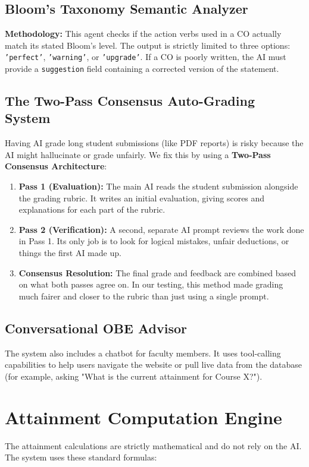 \documentclass[conference]{IEEEtran}
\begin{document}
\subsection{Bloom's Taxonomy Semantic Analyzer}
\textbf{Methodology:} This agent checks if the action verbs used in a CO actually match its stated Bloom's level. The output is strictly limited to three options: \texttt{'perfect'}, \texttt{'warning'}, or \texttt{'upgrade'}. If a CO is poorly written, the AI must provide a \texttt{suggestion} field containing a corrected version of the statement.

\subsection{The Two-Pass Consensus Auto-Grading System}
Having AI grade long student submissions (like PDF reports) is risky because the AI might hallucinate or grade unfairly. We fix this by using a \textbf{Two-Pass Consensus Architecture}:
\begin{enumerate}
    \item \textbf{Pass 1 (Evaluation):} The main AI reads the student submission alongside the grading rubric. It writes an initial evaluation, giving scores and explanations for each part of the rubric.
    \item \textbf{Pass 2 (Verification):} A second, separate AI prompt reviews the work done in Pass 1. Its only job is to look for logical mistakes, unfair deductions, or things the first AI made up.
    \item \textbf{Consensus Resolution:} The final grade and feedback are combined based on what both passes agree on. In our testing, this method made grading much fairer and closer to the rubric than just using a single prompt.
\end{enumerate}

\subsection{Conversational OBE Advisor}
The system also includes a chatbot for faculty members. It uses tool-calling capabilities to help users navigate the website or pull live data from the database (for example, asking "What is the current attainment for Course X?").

\section{Attainment Computation Engine}
The attainment calculations are strictly mathematical and do not rely on the AI. The system uses these standard formulas:
\end{document}

